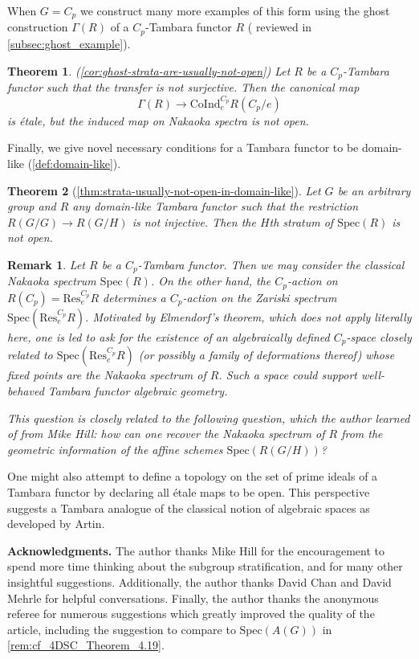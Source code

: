 \documentclass[11pt,dvipsnames]{amsart}
\newtheorem{letterthm}{Theorem}
\theoremstyle{BoldRemark}
\newtheorem{remark}[theorem]{Remark}
\newcommand{\Res}{\mathrm{Res}}
\newcommand{\Spec}{\mathrm{Spec}}
\newcommand{\Coind}{\mathrm{CoInd}}
\newcommand{\ghost}{\Gamma}
\begin{document}
When $G = C_p$ we construct many more examples of this form using the ghost construction $\Gamma(R)$ of a $C_p$-Tambara functor $R$ (\cite[Definition 7.3]{4DS} reviewed in \cref{subsec:ghost_example}).

\begin{letterthm}(\cref{cor:ghost-strata-are-usually-not-open})
    Let $R$ be a $C_p$-Tambara functor such that the transfer is not surjective. Then the canonical map
    \[ 
        \ghost(R) \rightarrow \Coind_e^{C_p} R(C_p/e) 
    \] 
    is \'{e}tale, but the induced map on Nakaoka spectra is not open.
\end{letterthm}

Finally, we give novel necessary conditions for a Tambara functor to be domain-like (\cref{def:domain-like}).

\begin{letterthm}[\cref{thm:strata-usually-not-open-in-domain-like}]
    Let $G$ be an arbitrary group and $R$ any domain-like Tambara functor such that the restriction $R(G/G) \rightarrow R(G/H)$ is not injective. Then the $H$th stratum of $\Spec(R)$ is not open.
\end{letterthm}

\begin{remark}
    Let $R$ be a $C_p$-Tambara functor. Then we may consider the classical Nakaoka spectrum $\Spec(R)$. On the other hand, the $C_p$-action on $R(C_p) = \Res_e^{C_p} R$ determines a $C_p$-action on the Zariski spectrum $\Spec(\Res_e^{C_p} R)$. Motivated by Elmendorf's theorem, which does not apply literally here, one is led to ask for the existence of an algebraically defined $C_p$-space closely related to $\Spec(\Res_e^{C_p} R)$ (or possibly a family of deformations thereof) whose fixed points are the Nakaoka spectrum of $R$. Such a space could support well-behaved Tambara functor algebraic geometry.

    This question is closely related to the following question, which the author learned of from Mike Hill: how can one recover the Nakaoka spectrum of $R$ from the geometric information of the affine schemes $\Spec(R(G/H))$?
\end{remark}

One might also attempt to define a topology on the set of prime ideals of a Tambara functor by declaring all \'{e}tale maps to be open. This perspective suggests a Tambara analogue of the classical notion of algebraic spaces as developed by Artin.

\vspace{3mm} \textbf{Acknowledgments.} The author thanks Mike Hill for the encouragement to spend more time thinking about the subgroup stratification, and for many other insightful suggestions. Additionally, the author thanks David Chan and David Mehrle for helpful conversations. Finally, the author thanks the anonymous referee for numerous suggestions which greatly improved the quality of the article, including the suggestion to compare to $\Spec(A(G))$ in \cref{rem:cf_4DSC_Theorem_4.19}.
\end{document}
